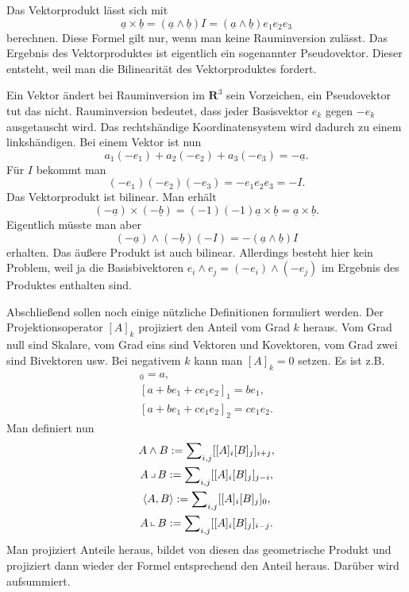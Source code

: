 \documentclass[a4paper,10pt,fleqn,twocolumn,twoside]{article}
\begin{document}
Das Vektorprodukt lässt sich mit
\[\underline a\times\underline b = (\underline a\wedge\underline b)I
= (\underline a\wedge\underline b)e_1e_2e_3\]
\noindent
berechnen. Diese Formel gilt nur, wenn man keine Rauminversion
zulässt. Das Ergebnis des Vektorproduktes ist eigentlich ein
sogenannter Pseudovektor. Dieser entsteht, weil man die
Bilinearität des Vektorproduktes fordert.

Ein Vektor ändert bei Rauminversion im \(\mathbf R^3\) sein
Vorzeichen, ein Pseudovektor tut das nicht. Rauminversion bedeutet,
dass jeder Basisvektor \(e_k\) gegen \(-e_k\) ausgetauscht wird.
Das rechtshändige Koordinatensystem wird dadurch zu einem
linkshändigen. Bei einem Vektor ist nun
\[a_1(-e_1)+a_2(-e_2)+a_3(-e_3) = -\underline a.\]
Für \(I\) bekommt man
\[(-e_1)(-e_2)(-e_3) = -e_1e_2e_3 = -I.\]
Das Vektorprodukt ist bilinear. Man erhält
\[(-\underline a)\times (-\underline b)
= (-1)(-1)\underline a\times\underline b
= \underline a\times\underline b.\]
Eigentlich müsste man aber
\[(-\underline a)\wedge (-\underline b)(-I)
= -(\underline a\wedge\underline b)I\]
erhalten. Das äußere Produkt ist auch bilinear. Allerdings besteht
hier kein Problem, weil ja die Basisbivektoren
\(e_i\wedge e_j = (-e_i)\wedge(-e_j)\) im Ergebnis des Produktes
enthalten sind.

Abschließend sollen noch einige nützliche Definitionen formuliert
werden. Der Projektionsoperator \([A]_k\) projiziert den Anteil
vom Grad \(k\) heraus. Vom Grad null sind Skalare, vom Grad eins
sind Vektoren und Kovektoren, vom Grad zwei sind Bivektoren
usw. Bei negativem \(k\) kann man \([A]_k=0\) setzen.
Es ist z.B.
\begin{gather*}
[a+be_1+ce_1e_2]_0 = a,\\
[a+be_1+ce_1e_2]_1 = be_1,\\
[a+be_1+ce_1e_2]_2 = ce_1e_2.
\end{gather*}
Man definiert nun
\begin{gather*}
A\wedge B := \sum\nolimits_{i,j} [[A]_i[B]_j]_{i+j},\\
A\,\big\lrcorner\,B := \sum\nolimits_{i,j} [[A]_i[B]_j]_{j-i},\\
\langle A,B\rangle := \sum\nolimits_{i,j} [[A]_i[B]_j]_0,\\
A\,\big\llcorner\,B := \sum\nolimits_{i,j} [[A]_i[B]_j]_{i-j}.
\end{gather*}
Man projiziert Anteile heraus, bildet von diesen das geometrische
Produkt und projiziert dann wieder der Formel entsprechend den Anteil
heraus. Darüber wird aufsummiert.
\end{document}
